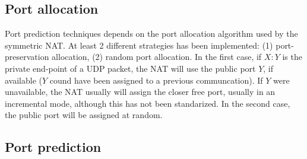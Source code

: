 \subsection{Port allocation}
Port prediction techniques depends on the port allocation algorithm
used by the symmetric NAT. At least 2 different strategies has been
implemented: (1) port-preservation allocation, (2) random port
allocation. In the first case, if $X:Y$ is the private end-point of a
UDP packet, the NAT will use the public port $Y$, if available ($Y$
cound have been assigned to a previous communcation). If $Y$ were
unavailable, the NAT usually will assign the closer free port, usually
in an incremental mode, although this has not been standarized. In the
second case, the public port will be assigned at random.


\subsection{Port prediction}
